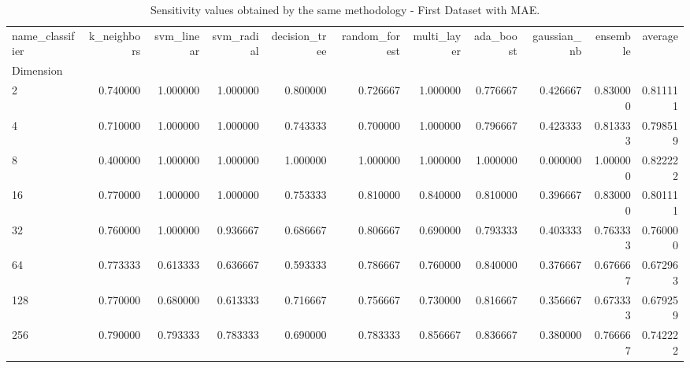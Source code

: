 \begin{table}
\centering
\caption{Sensitivity values obtained by the same methodology - First Dataset with MAE.}
\label{table:sensitivity_mae_noon-reproduction}
\begin{tabular}{lrrrrrrrrrr}
\toprule
name\_classifier &  k\_neighbors &  svm\_linear &  svm\_radial &  decision\_tree &  random\_forest &  multi\_layer &  ada\_boost &  gaussian\_nb &  ensemble &   average \\
Dimension &              &             &             &                &                &              &            &              &           &           \\
\midrule
2         &     0.740000 &    1.000000 &    1.000000 &       0.800000 &       0.726667 &     1.000000 &   0.776667 &     0.426667 &  0.830000 &  0.811111 \\
4         &     0.710000 &    1.000000 &    1.000000 &       0.743333 &       0.700000 &     1.000000 &   0.796667 &     0.423333 &  0.813333 &  0.798519 \\
8         &     0.400000 &    1.000000 &    1.000000 &       1.000000 &       1.000000 &     1.000000 &   1.000000 &     0.000000 &  1.000000 &  0.822222 \\
16        &     0.770000 &    1.000000 &    1.000000 &       0.753333 &       0.810000 &     0.840000 &   0.810000 &     0.396667 &  0.830000 &  0.801111 \\
32        &     0.760000 &    1.000000 &    0.936667 &       0.686667 &       0.806667 &     0.690000 &   0.793333 &     0.403333 &  0.763333 &  0.760000 \\
64        &     0.773333 &    0.613333 &    0.636667 &       0.593333 &       0.786667 &     0.760000 &   0.840000 &     0.376667 &  0.676667 &  0.672963 \\
128       &     0.770000 &    0.680000 &    0.613333 &       0.716667 &       0.756667 &     0.730000 &   0.816667 &     0.356667 &  0.673333 &  0.679259 \\
256       &     0.790000 &    0.793333 &    0.783333 &       0.690000 &       0.783333 &     0.856667 &   0.836667 &     0.380000 &  0.766667 &  0.742222 \\
\bottomrule
\end{tabular}
\end{table}



\newpage



\newpage

